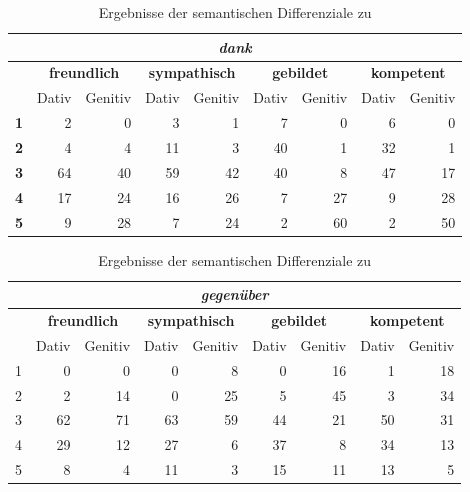 \begin{table}
\centering
\begin{tabular}{lrrrrrrrr}
\multicolumn{9}{c}{\textit{\textbf{dank}}} \\ \hline
\textit{\textbf{}} & \multicolumn{2}{c}{\textbf{freundlich}} & \multicolumn{2}{c}{\textbf{sympathisch}} & \multicolumn{2}{c}{\textbf{gebildet}} & \multicolumn{2}{c}{\textbf{kompetent}} \\ %
 & \multicolumn{1}{c}{Dativ} & \multicolumn{1}{c}{Genitiv} & \multicolumn{1}{c}{Dativ} & \multicolumn{1}{c}{Genitiv} & \multicolumn{1}{c}{Dativ} & \multicolumn{1}{c}{Genitiv} & \multicolumn{1}{c}{Dativ} & \multicolumn{1}{c}{Genitiv} \\ \hline
\textbf{1} & 2 & 0 & 3 & 1 & 7 & 0 & 6 & 0 \\ %
\textbf{2} & 4 & 4 & 11 & 3 & 40 & 1 & 32 & 1 \\ %
\textbf{3} & 64 & 40 & 59 & 42 & 40 & 8 & 47 & 17 \\ %
\textbf{4} & 17 & 24 & 16 & 26 & 7 & 27 & 9 & 28 \\ %
\textbf{5} & 9 & 28 & 7 & 24 & 2 & 60 & 2 & 50 
\end{tabular}
\caption{Ergebnisse der semantischen Differenziale zu \dank}
\label{table:sdsdankAnh}
\end{table}

\begin{table}
\centering
\begin{tabular}{lrrrrrrrr}
\multicolumn{9}{c}{\textit{\textbf{gegenüber}}} \\ \hline
\textit{\textbf{}} & \multicolumn{2}{c}{\textbf{freundlich}} & \multicolumn{2}{c}{\textbf{sympathisch}} & \multicolumn{2}{c}{\textbf{gebildet}} & \multicolumn{2}{c}{\textbf{kompetent}} \\ %
 & \multicolumn{1}{c}{Dativ} & \multicolumn{1}{c}{Genitiv} & \multicolumn{1}{c}{Dativ} & \multicolumn{1}{c}{Genitiv} & \multicolumn{1}{c}{Dativ} & \multicolumn{1}{c}{Genitiv} & \multicolumn{1}{c}{Dativ} & \multicolumn{1}{c}{Genitiv} \\ \hline
1 & 0 & 0 & 0 & 8 & 0 & 16 & 1 & 18 \\ %
2 & 2 & 14 & 0 & 25 & 5 & 45 & 3 & 34 \\ %
3 & 62 & 71 & 63 & 59 & 44 & 21 & 50 & 31 \\ %
4 & 29 & 12 & 27 & 6 & 37 & 8 & 34 & 13 \\ %
5 & 8 & 4 & 11 & 3 & 15 & 11 & 13 & 5 
\end{tabular}
\caption{Ergebnisse der semantischen Differenziale zu \gegenueber}
\label{table:sdsgegenueberAnh}
\end{table}

